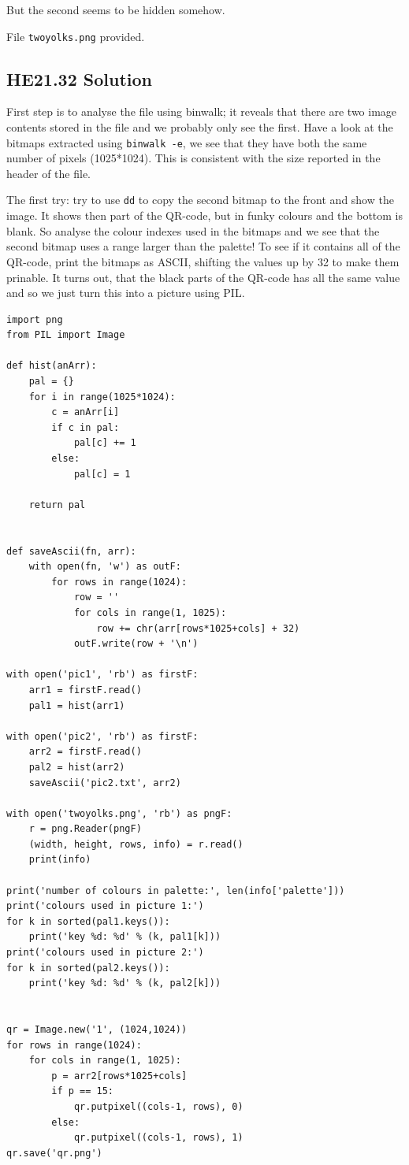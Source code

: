 \documentclass[english,a4paper,nols,noindent]{tufte-handout}
\begin{document}
But the second seems to be hidden somehow.

File \verb+twoyolks.png+ provided.

\hypertarget{he21.32-solution}{%
\subsection{HE21.32 Solution}\label{he21.32-solution}}

\noindent First step is to analyse the file using binwalk; it reveals that
there are two image contents stored in the file and we probably only see the
first.  Have a look at the bitmaps extracted using \verb+binwalk -e+, we see
that they have both the same number of pixels (1025*1024).  This is consistent
with the size reported in the header of the file.

The first try: try to use \verb+dd+ to copy the second bitmap to the front and
show the image.  It shows then part of the QR-code, but in funky colours and
the bottom is blank.  So analyse the colour indexes used in the bitmaps and we
see that the second bitmap uses a range larger than the palette!  To see if it
contains all of the QR-code, print the bitmaps as ASCII, shifting the values up
by 32 to make them prinable.  It turns out, that the black parts of the QR-code
has all the same value and so we just turn this into a picture using PIL.

\begin{verbatim}
import png
from PIL import Image

def hist(anArr):
    pal = {}
    for i in range(1025*1024):
        c = anArr[i]
        if c in pal:
            pal[c] += 1
        else:
            pal[c] = 1

    return pal


def saveAscii(fn, arr):
    with open(fn, 'w') as outF:
        for rows in range(1024):
            row = ''
            for cols in range(1, 1025):
                row += chr(arr[rows*1025+cols] + 32)
            outF.write(row + '\n')

with open('pic1', 'rb') as firstF:
    arr1 = firstF.read()
    pal1 = hist(arr1)

with open('pic2', 'rb') as firstF:
    arr2 = firstF.read()
    pal2 = hist(arr2)
    saveAscii('pic2.txt', arr2)

with open('twoyolks.png', 'rb') as pngF:
    r = png.Reader(pngF)
    (width, height, rows, info) = r.read()
    print(info)

print('number of colours in palette:', len(info['palette']))
print('colours used in picture 1:')
for k in sorted(pal1.keys()):
    print('key %d: %d' % (k, pal1[k]))
print('colours used in picture 2:')
for k in sorted(pal2.keys()):
    print('key %d: %d' % (k, pal2[k]))


qr = Image.new('1', (1024,1024))
for rows in range(1024):
    for cols in range(1, 1025):
        p = arr2[rows*1025+cols]
        if p == 15:
            qr.putpixel((cols-1, rows), 0)
        else:
            qr.putpixel((cols-1, rows), 1)
qr.save('qr.png')
\end{verbatim} 
\end{document}
